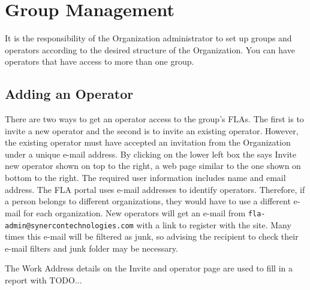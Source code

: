 \documentclass[11pt, oneside]{book}
\begin{document}
\section{Group Management}

It is the responsibility of the Organization administrator to set
up groups and operators according to the desired structure of the
Organization. You can have operators that have access to more than
one group.




\subsection{Adding an Operator}

\noindent\begin{minipage}{0.45\textwidth}%
There are two ways to get an operator access to the group's FLAs.
The first is to invite a new operator and the second is to invite
an existing operator. However, the existing operator must have accepted
an invitation from the Organization under a unique e-mail address.
By clicking on the lower left box the says \textsf{Invite new operator}
shown on top to the right, a web page similar to
the one shown on bottom to the right. The required
user information includes name and email address. The FLA portal uses
e-mail addresses to identify operators. Therefore, if a person belongs
to different organizations, they would have to use a different e-mail
for each organization. New operators will get an e-mail from \texttt{fla-admin@synercontechnologies.com}
with a link to register with the site. Many times this e-mail will
be filtered as junk, so advising the recipient to check their e-mail
filters and junk folder may be necessary.

The Work Address details on the Invite and operator page are used
to fill in a report with TODO...
\end{minipage}%
\hfill%
\end{document}
